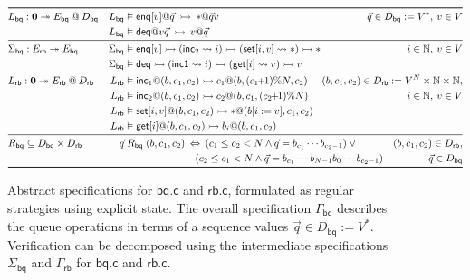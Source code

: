 \documentclass[acmsmall,screen,review,anonymous,nonacm]{acmart}
\newcommand{\kw}[1]{\ensuremath{ \mathsf{#1} }}
\newcommand{\emptysig}{\mathbf0}
\begin{document}
\begin{figure} %
  \small
\begin{align*}
\toprule
&
  L_\kw{bq} : \emptysig \twoheadrightarrow E_\kw{bq} \mathbin@ D_\kw{bq}
&  
  L_\kw{bq} &\vDash
      \kw{enq}[v] @ \vec{q}
      \:\rightarrowtail\:
      {*} @ \vec{q}v
&
  \hspace{-5em}
  \vec{q} \in D_\kw{bq} := V^*, \:
  v \in V
\\ &&
  L_\kw{bq} &\vDash
      \kw{deq} @ v\vec{q}
      \:\rightarrowtail\:
      v @ \vec{q}
\\
\midrule
&
  \Sigma_\kw{bq} : E_\kw{rb} \twoheadrightarrow E_\kw{bq}
&
  \Sigma_\kw{bq} &\vDash
      \kw{enq}[v] \rightarrowtail
      (\kw{inc}_2 \leadsto i) \rightarrowtail
      (\kw{set}[i, v] \leadsto *) \rightarrowtail
      *
&
  i \in \mathbb{N}, \:
  v \in V
\\ &&
    \Sigma_\kw{bq} &\vDash
      \kw{deq} \rightarrowtail
      (\kw{inc1} \leadsto i) \rightarrowtail
      (\kw{get}[i] \leadsto v) \rightarrowtail
      v
\\ &
  L_\kw{rb} : \emptysig \twoheadrightarrow E_\kw{rb} \mathbin@ D_\kw{rb}
&
  L_\kw{rb} &\vDash
    \kw{inc}_1@(b, c_1, c_2) \rightarrowtail
    c_1@(b, (c_1\!\!+\!\!1) \% N, c_2)
&
  \hspace{-8em}
  (b, c_1, c_2) \in D_\kw{rb} :=
    V^N \times \mathbb{N} \times \mathbb{N},
\\ &&
  L_\kw{rb} &\vDash
    \kw{inc}_2 @(b, c_1, c_2) \rightarrowtail
    c_2@(b, c_1, (c_2\!\!+\!\!1) \% N)
&
  i \in \mathbb{N}, \:
  v \in V
\\ &&
  L_\kw{rb} &\vDash
    \kw{set}[i, v]@(b, c_1, c_2) \rightarrowtail
    {*}@(b[i := v], c_1, c_2)
\\ &&
  L_\kw{rb} &\vDash
    \kw{get}[i]@(b, c_1, c_2) \rightarrowtail
    b_i@(b, c_1, c_2)
\\ \midrule &
  R_\kw{bq} \subseteq D_\kw{bq} \times D_\kw{rb}
&
        \vec{q} &\mathrel{R_\kw{bq}} (b, c_1, c_2) \: \Leftrightarrow \:
           (c_1 \le c_2 < N \wedge
            \vec{q} = b_{c_1} \cdots b_{c_2-1}) \vee {}
&
  (b, c_1, c_2) \in D_\kw{rb},
\\ &&
         & \hspace{16.3ex}
           (c_2 \le c_1 < N \wedge
            \vec{q} = b_{c_1} \cdots b_{N-1} b_0 \cdots b_{c_2 - 1})
&
  \vec{q} \in D_\kw{bq}
\\
\bottomrule
\end{align*}
\vspace{-2.5em}
  \caption{Abstract specifications for $\kw{bq.c}$ and $\kw{rb.c}$,
    formulated as regular strategies using explicit state.
    The overall specification $\Gamma_\kw{bq}$
    describes the queue operations in terms of
    a sequence values $\vec{q} \in D_\kw{bq} := V^*$.
    Verification can be decomposed using the intermediate specifications
    $\Sigma_\kw{bq}$ and $\Gamma_\kw{rb}$ for
    $\kw{bq.c}$ and $\kw{rb.c}$.}
  \label{fig:spec}
\end{figure}
\end{document}
